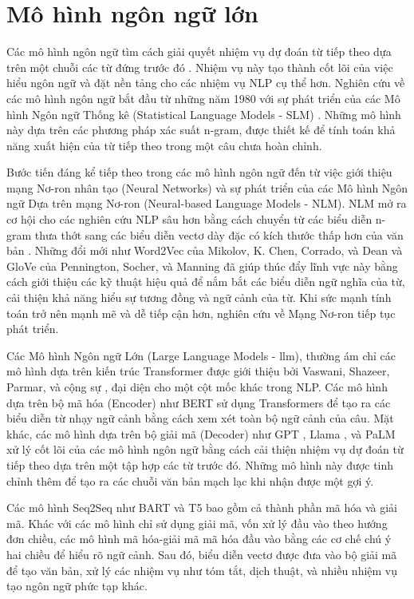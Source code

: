 \section{Mô hình ngôn ngữ lớn}
\label{section:large_language_model}
Các mô hình ngôn ngữ tìm cách giải quyết nhiệm vụ dự đoán từ tiếp theo dựa trên một chuỗi các từ đứng trước đó \cite{zhao2023survey}. Nhiệm vụ này tạo thành cốt lõi của việc hiểu ngôn ngữ và đặt nền tảng cho các nhiệm vụ NLP cụ thể hơn. Nghiên cứu về các mô hình ngôn ngữ bắt đầu từ những năm 1980 với sự phát triển của các Mô hình Ngôn ngữ Thống kê (Statistical Language Models - SLM) \cite{rosenfeld2000two}. Những mô hình này dựa trên các phương pháp xác suất n-gram, được thiết kế để tính toán khả năng xuất hiện của từ tiếp theo trong một câu chưa hoàn chỉnh.

Bước tiến đáng kể tiếp theo trong các mô hình ngôn ngữ đến từ việc giới thiệu mạng Nơ-ron nhân tạo (Neural Networks) và sự phát triển của các Mô hình Ngôn ngữ Dựa trên mạng Nơ-ron (Neural-based Language Models - NLM). NLM mở ra cơ hội cho các nghiên cứu NLP sâu hơn bằng cách chuyển từ các biểu diễn n-gram thưa thớt sang các biểu diễn vectơ dày đặc có kích thước thấp hơn của văn bản \cite{bengio2000neural}. Những đổi mới như Word2Vec của Mikolov, K. Chen, Corrado, và Dean \cite{mikolov2013efficient} và GloVe của Pennington, Socher, và Manning \cite{pennington2014glove} đã giúp thúc đẩy lĩnh vực này bằng cách giới thiệu các kỹ thuật hiệu quả để nắm bắt các biểu diễn ngữ nghĩa của từ, cải thiện khả năng hiểu sự tương đồng và ngữ cảnh của từ. Khi sức mạnh tính toán trở nên mạnh mẽ và dễ tiếp cận hơn, nghiên cứu về Mạng Nơ-ron tiếp tục phát triển.

Các Mô hình Ngôn ngữ Lớn (Large Language Models - \gls{llm}), thường ám chỉ các mô hình dựa trên kiến trúc Transformer được giới thiệu bởi Vaswani, Shazeer, Parmar, và cộng sự \cite{vaswani2017attention}, đại diện cho một cột mốc khác trong NLP. Các mô hình dựa trên bộ mã hóa (Encoder) như BERT \cite{devlin2018bert} sử dụng Transformers để tạo ra các biểu diễn từ nhạy ngữ cảnh bằng cách xem xét toàn bộ ngữ cảnh của câu. Mặt khác, các mô hình dựa trên bộ giải mã (Decoder) như GPT \cite{radford2018improving}, Llama \cite{touvron2023llama}, và PaLM \cite{chowdhery2023palm} xử lý cốt lõi của các mô hình ngôn ngữ bằng cách cải thiện nhiệm vụ dự đoán từ tiếp theo dựa trên một tập hợp các từ trước đó. Những mô hình này được tinh chỉnh thêm để tạo ra các chuỗi văn bản mạch lạc khi nhận được một gợi ý.

Các mô hình Seq2Seq như BART \cite{lewis2019bart} và T5 \cite{raffel2020exploring} bao gồm cả thành phần mã hóa và giải mã. Khác với các mô hình chỉ sử dụng giải mã, vốn xử lý đầu vào theo hướng đơn chiều, các mô hình mã hóa-giải mã mã hóa đầu vào bằng các cơ chế chú ý hai chiều để hiểu rõ ngữ cảnh. Sau đó, biểu diễn vectơ được đưa vào bộ giải mã để tạo văn bản, xử lý các nhiệm vụ như tóm tắt, dịch thuật, và nhiều nhiệm vụ tạo ngôn ngữ phức tạp khác.

